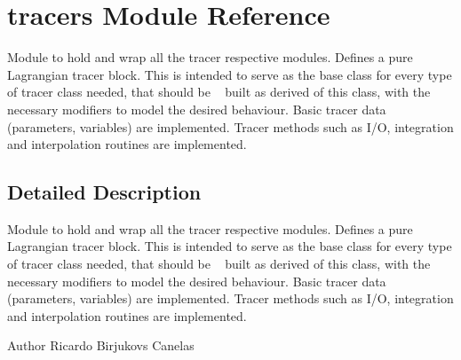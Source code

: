 \hypertarget{namespacetracers}{}\section{tracers Module Reference}
\label{namespacetracers}


Module to hold and wrap all the tracer respective modules. Defines a pure Lagrangian tracer block. This is intended to serve as the base class for every type of tracer class needed, that should be ~\newline
 built as derived of this class, with the necessary modifiers to model the desired behaviour. Basic tracer data (parameters, variables) are implemented. Tracer methods such as I/O, integration and interpolation routines are implemented.  




\subsection{Detailed Description}
Module to hold and wrap all the tracer respective modules. Defines a pure Lagrangian tracer block. This is intended to serve as the base class for every type of tracer class needed, that should be ~\newline
 built as derived of this class, with the necessary modifiers to model the desired behaviour. Basic tracer data (parameters, variables) are implemented. Tracer methods such as I/O, integration and interpolation routines are implemented. 

\begin{DoxyAuthor}{Author}
Ricardo Birjukovs Canelas 
\end{DoxyAuthor}
